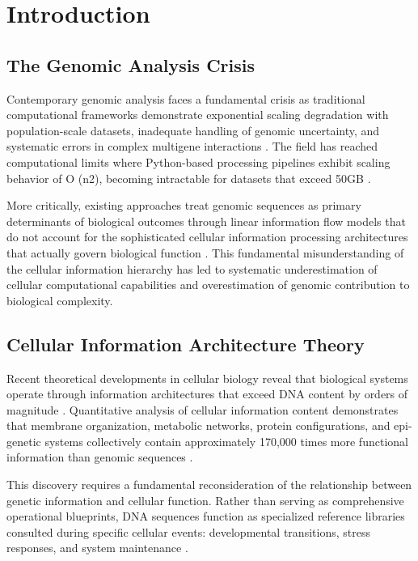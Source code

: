 \documentclass[12pt,a4paper]{article}
\begin{document}
\section{Introduction}

\subsection{The Genomic Analysis Crisis}

Contemporary genomic analysis faces a fundamental crisis as traditional computational frameworks demonstrate exponential scaling degradation with population-scale datasets, inadequate handling of genomic uncertainty, and systematic errors in complex multigene interactions \cite{mckenna2010genome, landrum2018clinvar, richards2015standards}. The field has reached computational limits where Python-based processing pipelines exhibit scaling behavior of O (n2), becoming intractable for datasets that exceed 50GB \cite{li2009sequence}.

More critically, existing approaches treat genomic sequences as primary determinants of biological outcomes through linear information flow models that do not account for the sophisticated cellular information processing architectures that actually govern biological function \cite{alberts2014molecular, lodish2016molecular}. This fundamental misunderstanding of the cellular information hierarchy has led to systematic underestimation of cellular computational capabilities and overestimation of genomic contribution to biological complexity.

\subsection{Cellular Information Architecture Theory}

Recent theoretical developments in cellular biology reveal that biological systems operate through information architectures that exceed DNA content by orders of magnitude \cite{shannon1948mathematical, cover2006elements}. Quantitative analysis of cellular information content demonstrates that membrane organization, metabolic networks, protein configurations, and epi-genetic systems collectively contain approximately 170,000 times more functional information than genomic sequences \cite{nelson2017lehninger, stryer2015biochemistry}.

This discovery requires a fundamental reconsideration of the relationship between genetic information and cellular function. Rather than serving as comprehensive operational blueprints, DNA sequences function as specialized reference libraries consulted during specific cellular events: developmental transitions, stress responses, and system maintenance \cite{encode2012integrated, venter2001sequence}.
\end{document}
